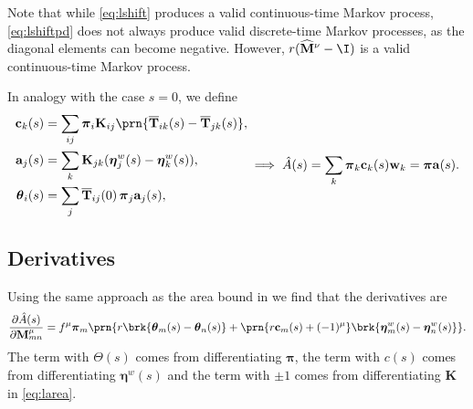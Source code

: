 \documentclass[12pt]{article}
\newcommand{\eq}{\pib}
\newcommand{\fpt}{\mathbf{T}}
\newcommand{\fptb}{\overline{\fpt}}
\newcommand{\pib}{\boldsymbol{\pi}}
\newcommand{\etw}{\boldsymbol{\eta}^w}
\newcommand{\thb}{\boldsymbol{\theta}}
\newcommand{\w}{\mathbf{w}}
\newcommand{\M}{\mathbf{M}}
\newcommand{\enc}{\mathbf{K}}
\renewcommand{\pdiff}[2]{\frac{\partial #1}{\partial #2}}
\newcommand{\shift}[1]{\widehat{#1}}
\begin{document}
Note that while \cref{eq:lshift} produces a valid continuous-time Markov process, \cref{eq:lshiftpd} does not always produce valid discrete-time Markov processes, as the diagonal elements can become negative.
However, \(r (\shift{\M}^\nu - \I)\) is a valid continuous-time Markov process.

In analogy with the case $s=0$, we define
%
\begin{equation}\label{eq:lareacoeffs}
  \begin{aligned}
    \mathbf{c}_k(s) &= \sum_{ij} \eq_i \enc_{ij} \prn{\fptb_{ik}(s)-\fptb_{jk}(s)}, \\
    \mathbf{a}_j(s) &= \sum_{k} \enc_{jk} (\etw_{j}(s) - \etw_{k}(s)), \\
    \thb_i(s) &= \sum_j \fptb_{ij}(0)\, \eq_j \mathbf{a}_j(s), \\
  \end{aligned}
    \implies
    \hat{A}(s) 
      = \sum_k \eq_k \mathbf{c}_k(s) \w_k
      = \eq \mathbf{a}(s).
\end{equation}
%

\subsection{Derivatives}\label{sec:lderiv}

Using the same approach as the area bound in \cite{Lahiri2013synapse} we find that the derivatives are
%
\begin{equation}\label{eq:lAdiff}
  \pdiff{\hat{A}(s)}{\M^\mu_{mn}}
     = f^\mu \eq_m \prn{ r \brk{\thb_m(s) - \thb_n(s)}
     +\prn{r \mathbf{c}_m(s) + (-1)^\mu} \brk{\etw_m(s) - \etw_n(s)} }.
\end{equation}
%
The term with $\Theta(s)$ comes from differentiating $\eq$, the term with $c(s)$ comes from differentiating $\etw(s)$ and the term with $\pm1$ comes from differentiating $\enc$ in \eqref{eq:larea}.
\end{document}
